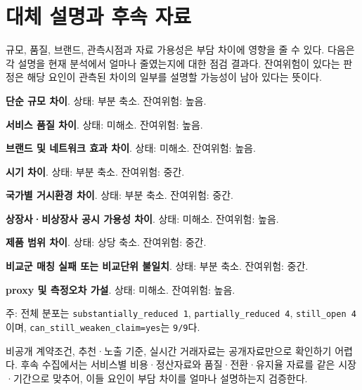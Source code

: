 \section{대체 설명과 후속 자료}
규모, 품질, 브랜드, 관측시점과 자료 가용성은 부담 차이에 영향을 줄 수 있다. 다음은 각 설명을 현재 분석에서 얼마나 줄였는지에 대한 점검 결과다. 잔여위험이 있다는 판정은 해당 요인이 관측된 차이의 일부를 설명할 가능성이 남아 있다는 뜻이다.

\begingroup
\small
\begin{summarylist}
  \item \textbf{단순 규모 차이}. 상태: 부분 축소. 잔여위험: 높음.
  \item \textbf{서비스 품질 차이}. 상태: 미해소. 잔여위험: 높음.
  \item \textbf{브랜드 및 네트워크 효과 차이}. 상태: 미해소. 잔여위험: 높음.
  \item \textbf{시기 차이}. 상태: 부분 축소. 잔여위험: 중간.
  \item \textbf{국가별 거시환경 차이}. 상태: 부분 축소. 잔여위험: 중간.
  \item \textbf{상장사·비상장사 공시 가용성 차이}. 상태: 미해소. 잔여위험: 높음.
  \item \textbf{제품 범위 차이}. 상태: 상당 축소. 잔여위험: 중간.
  \item \textbf{비교군 매칭 실패 또는 비교단위 불일치}. 상태: 부분 축소. 잔여위험: 중간.
  \item \textbf{proxy 및 측정오차 가설}. 상태: 미해소. 잔여위험: 높음.
\end{summarylist}
{\par\raggedright\footnotesize 주: 전체 분포는 \texttt{substantially\_reduced 1}, \texttt{partially\_reduced 4}, \texttt{still\_open 4}이며, \nolinkurl{can_still_weaken_claim=yes}는 \texttt{9/9}다.\par}
\endgroup

비공개 계약조건, 추천·노출 기준, 실시간 거래자료는 공개자료만으로 확인하기 어렵다. 후속 수집에서는 서비스별 비용·정산자료와 품질·전환·유지율 자료를 같은 시장·기간으로 맞추어, 이들 요인이 부담 차이를 얼마나 설명하는지 검증한다.

